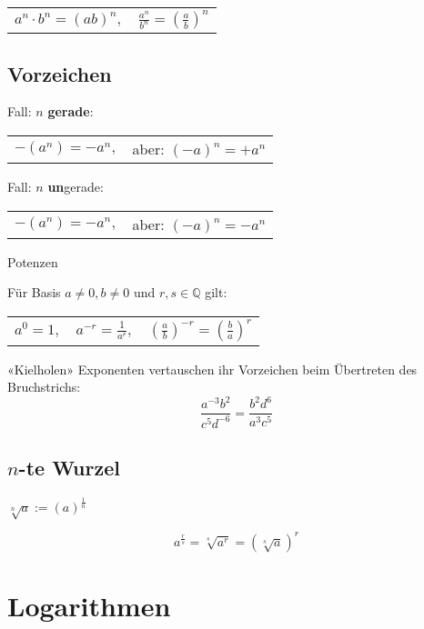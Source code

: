 \begin{multicols}{2}
\begin{tabular}{cc}
$a^n\cdot{}b^n = (ab)^n,$ & $\frac{a^n}{b^n} =\left(\frac{a}b\right)^n $\\
 \end{tabular}
 

\subsection{Vorzeichen}
Fall: $n$ \textbf{gerade}:

\begin{tabular}{cc}
 $-(a^n) = -a^n,$ & aber: $(-a)^n = +a^n$\\
 \end{tabular} 

Fall: $n$ \textbf{un}gerade:

\begin{tabular}{cc}
 $-(a^n) = -a^n,$ & aber: $(-a)^n = -a^n$\\
 \end{tabular} 


\begin{gesetz}{Potenzen}{}

Für Basis $a\ne 0, b\ne 0$ und $r, s\in\mathbb{Q}$ gilt:

\begin{tabular}{ccc}
$a^0=1,$ & $a^{-r} = \frac1{a^r},$ & $\left(\frac{a}b\right)^{-r} = \left(\frac{b}a\right)^r$ \\
 \end{tabular}
\end{gesetz}

\begin{rezept}{«Kielholen»}{}{}
Exponenten vertauschen ihr Vorzeichen beim Übertreten des Bruchstrichs:
$$\frac{a^{-3}b^2}{c^5d^{-6}} = \frac{b^2d^6}{a^3c^5}$$
\end{rezept}

\forceCB{}
\subsection{$n$-te Wurzel}
$\sqrt[n]{a} := \left(a\right)^\frac1n$
\begin{gesetz}{}{}
$$a^{\frac{r}s} = \sqrt[s]{a^r} = \left(\sqrt[s]a\right)^r$$
\end{gesetz}

\hrulefill
\section{Logarithmen}


\end{multicols}

